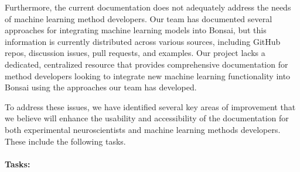 Furthermore, the current documentation does not adequately address the needs of
machine learning method developers. Our team has documented several approaches
for integrating machine learning models into Bonsai, but this information is
currently distributed across various sources, including GitHub repos,
discussion issues, pull requests, and examples. Our project lacks a dedicated,
centralized resource that provides comprehensive documentation for method
developers looking to integrate new machine learning functionality into Bonsai
using the approaches our team has developed.

To address these issues, we have identified several key areas of improvement
that we believe will enhance the usability and accessibility of the
documentation for both experimental neuroscientists and machine learning
methods developers. These include the following tasks.

\paragraph{Tasks:}\mbox{}\\

